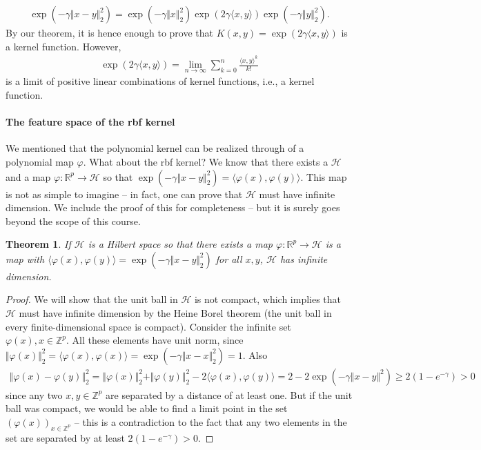 \documentclass{article}
\newcommand{\calH}{\mathcal{H}}
\newcommand{\sprod}[1]{\langle #1 \rangle}
\newcommand{\R}{\mathbb{R}}
\newcommand{\Z}{\mathbb{Z}}
\newtheorem{theorem}{Theorem}
\newcommand{\norm}[1]{\Vert #1 \Vert}
\begin{document}
\begin{align*}
   \exp(-\gamma \norm{x-y}_2^2) = \exp(-\gamma\norm{x}_2^2) \exp(2\gamma \sprod{x,y})\exp(-\gamma \norm{y}_2^2).
\end{align*}
By our theorem, it is hence enough to prove that $K(x,y) =\exp(2\gamma \sprod{x,y})$ is a kernel function. However,
\begin{align*}
    \exp(2\gamma \sprod{x,y}) = \lim_{n\to \infty} \sum_{k=0}^n \frac{\sprod{x,y}^k}{k!}
\end{align*}
is a limit of positive linear combinations of kernel functions, i.e., a kernel function.

\paragraph{The feature space of the rbf kernel} We mentioned that the polynomial kernel can be realized through of a polynomial map $\varphi$. What about the rbf kernel? We know that there exists a $\calH$ and a map $\varphi:\R^p\to \calH$ so that $\exp(-\gamma\norm{x-y}_2^2)= \sprod{\varphi(x),\varphi(y)}$. This map is not as simple to imagine -- in fact, one can prove that $\calH$ must have infinite dimension. We include the proof of this for completeness -- but it is surely goes beyond the scope of this course.

\begin{theorem}
    If $\calH$ is a Hilbert space so that there exists a map $\varphi:\R^p\to \calH$ is a map with $\sprod{\varphi(x),\varphi(y)} = \exp(-\gamma \norm{x-y}_2^2)$ for all $x,y$, $\calH$ has infinite dimension.
\end{theorem}
\begin{proof}
    We will show that the unit ball in $\calH$ is not compact, which implies that $\calH$ must have infinite dimension by the Heine Borel theorem (the unit ball in every finite-dimensional space is compact). Consider the infinite set $\varphi(x), x\in \Z^p$. All these elements have unit norm, since $\norm{\varphi(x)}_2^2=\sprod{\varphi(x),\varphi(x)}=\exp(-\gamma \norm{x-x}_2^2)=1$. Also
    \begin{align*}
        \norm{\varphi(x)-\varphi(y)}_2^2 = \norm{\varphi(x)}_2^2+\norm{\varphi(y)}_2^2 - 2\sprod{\varphi(x),\varphi(y)} = 2 - 2\exp(-\gamma\norm{x-y}^2)\geq 2(1-e^{-\gamma})>0
    \end{align*}
    since any two $x,y\in \Z^p$ are separated by a distance of at least one. But if the unit ball was compact, we would be able to find a limit point in the set $(\varphi(x))_{x\in \Z^p}$ -- this is a contradiction to the fact that any two elements in the set are separated by at least $2(1-e^{-\gamma})>0$.
\end{proof}
\end{document}
